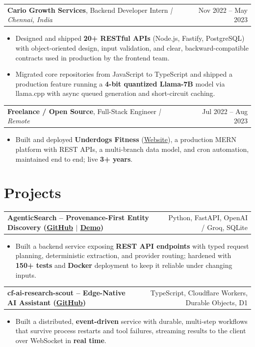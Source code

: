 \documentclass[letterpaper,11pt]{article}
\makeatletter
\newcommand{\expItem}[4]{%
  \vspace{3pt}
  \begin{tabular*}{\textwidth}{@{}l@{\extracolsep{\fill}}r@{}}
    \textbf{#1}, #2 \textit{| #3} & #4 \\
  \end{tabular*}\par\vspace{-2pt}
}
\newcommand{\projItem}[2]{%
  \vspace{6pt}
  \begin{tabular*}{\textwidth}{@{}l@{\extracolsep{\fill}}r@{}}
    \textbf{#1} & #2 \\
  \end{tabular*}\par\vspace{-2pt}
}
\makeatother
\begin{document}
\expItem{Cario Growth Services}{Backend Developer Intern}{Chennai, India}{Nov 2022 -- May 2023}
\begin{itemize}
  \item Designed and shipped \textbf{20+ RESTful APIs} (Node.js, Fastify, PostgreSQL) with object-oriented design, input validation, and clear, backward-compatible contracts used in production by the frontend team.
  \item Migrated core repositories from JavaScript to TypeScript and shipped a production feature running a \textbf{4-bit quantized Llama-7B} model via llama.cpp with async queued generation and short-circuit caching.
\end{itemize}

\expItem{Freelance / Open Source}{Full-Stack Engineer}{Remote}{Jul 2022 -- Aug 2023}
\begin{itemize}
  \item Built and deployed \textbf{Underdogs Fitness} (\href{https://www.underdogsfitness.in/}{Website}), a production MERN platform with REST APIs, a multi-branch data model, and cron automation, maintained end to end; live \textbf{3+ years}.
\end{itemize}

\section{Projects}

\projItem{AgenticSearch -- Provenance-First Entity Discovery {\normalfont\small(\href{https://github.com/Deva-1903/ciir_agentic_search}{GitHub} $\vert$ \href{https://agentic-search-negglszkwa-uc.a.run.app}{Demo})}}{Python, FastAPI, OpenAI / Groq, SQLite}
\begin{itemize}
  \item Built a backend service exposing \textbf{REST API endpoints} with typed request planning, deterministic extraction, and provider routing; hardened with \textbf{150+ tests} and \textbf{Docker} deployment to keep it reliable under changing inputs.
\end{itemize}

\projItem{cf-ai-research-scout -- Edge-Native AI Assistant {\normalfont\small(\href{https://github.com/Deva-1903/cf_ai_research_scout}{GitHub})}}{TypeScript, Cloudflare Workers, Durable Objects, D1}
\begin{itemize}
  \item Built a distributed, \textbf{event-driven} service with durable, multi-step workflows that survive process restarts and tool failures, streaming results to the client over WebSocket in \textbf{real time}.
\end{itemize}
\end{document}
